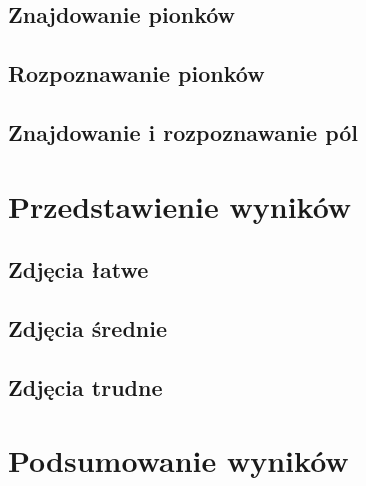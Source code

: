 \documentclass[a4paper]{article}
\begin{document}
    \subsection{Znajdowanie pionków}

    \subsection{Rozpoznawanie pionków}

    \subsection{Znajdowanie i rozpoznawanie pól}
      
\section{Przedstawienie wyników}
    \subsection{Zdjęcia łatwe}
    \subsection{Zdjęcia średnie}
    \subsection{Zdjęcia trudne}
\section{Podsumowanie wyników}
\end{document}
